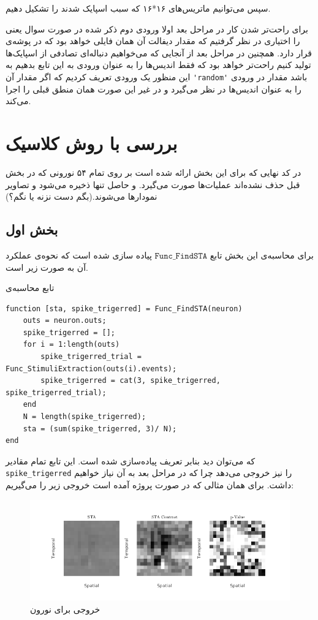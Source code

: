\documentclass[12pt,onecolumn,a4paper,fleqn]{article}
\newcommand{\pf}[1]{$\mathtt{#1}$}
\begin{document}
سپس می‌توانیم ماتریس‌های ۱۶*۱۶ که سبب اسپایک شدند را تشکیل دهیم.

برای راحت‌تر شدن کار در مراحل بعد اولا ورودی دوم ذکر شده در صورت سوال یعنی  را اختیاری در نظر گرفتیم که مقدار دیفالت آن همان فایلی خواهد بود که در پوشه‌ی  قرار دارد. همچنین در مراحل بعد از آنجایی که می‌خواهیم دنباله‌ای تصادفی از اسپایک‌ها تولید کنیم راحت‌تر خواهد بود که فقط اندیس‌ها را به عنوان ورودی به این تابع بدهیم به این منظور یک ورودی  تعریف کردیم که اگر مقدار آن 
\lstinline[style=Matlab-editor, tabsize=2]{'random'}
باشد مقدار  در ورودی را به عنوان اندیس‌ها در نظر می‌گیرد و در غیر این صورت همان منطق قبلی را اجرا می‌کند.
		 
\pagebreak

\section{بررسی با روش کلاسیک }

در کد نهایی که برای این بخش ارائه شده‌ است بر روی تمام ۵۴ نورونی که در بخش قبل حذف نشده‌اند عملیات‌ها صورت می‌گیرد. و حاصل تنها ذخیره می‌شود و تصاویر نمودار‌ها  می‌شوند.(بگم دست نزنه یا نگم؟) 

\subsection{بخش اول}
برای محاسبه‌ی این بخش تابع \pf{Func\_FindSTA} پیاده سازی شده است که نحوه‌ی عملکرد آن به صورت زیر است.

\begin{code}{تابع محاسبه‌ی }
	\begin{latin}
		\begin{lstlisting}[style=Matlab-editor, tabsize=2]
function [sta, spike_trigerred] = Func_FindSTA(neuron)
	outs = neuron.outs;
	spike_trigerred = [];
	for i = 1:length(outs)
		spike_trigerred_trial = Func_StimuliExtraction(outs(i).events);
		spike_trigerred = cat(3, spike_trigerred, spike_trigerred_trial);
	end
	N = length(spike_trigerred);
	sta = (sum(spike_trigerred, 3)/ N);
end		\end{lstlisting}
	\end{latin}
\end{code}

که می‌توان دید بنابر تعریف  پیاده‌سازی شده است. این تابع تمام مقادیر 
\lstinline[style=Matlab-editor, tabsize=2]{spike_trigerred}
را نیز خروجی می‌دهد چرا که در مراحل بعد به آن نیاز خواهیم داشت. برای همان مثالی که در صورت پروژه آمده است خروجی زیر را می‌گیریم:
\begin{figure}[h]
	\centering
	\includegraphics[width=0.5\linewidth]{photos/sta.png}
	\caption{خروجی برای نورون }
\end{figure}
\end{document}
